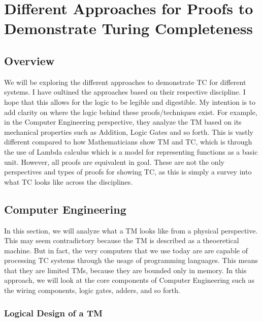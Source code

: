 \chapter{Different Approaches for Proofs to Demonstrate Turing Completeness}\label{chapter:ProofApproachesForTC}

\section{Overview}\label{sec:ProofOverview}

We will be exploring the different approaches to demonstrate TC for different systems.
I have oultined the approaches based on their respective discipline.
I hope that this allows for the logic to be legible and digestible.
My intention is to add clarity on where the logic behind these proofs/techniques exist.
For example, in the Computer Engineering perspective, they analyze the TM based on its mechanical properties such as Addition, Logic Gates and so forth.
This is vastly different compared to how Mathematicians show TM and TC, which is through the use of Lambda calculus which is a model for representing functions as a basic unit.
However, all proofs are equivalent in goal.
These are not the only perspectives and types of proofs for showing TC, as this is simply a survey into what TC looks like across the disciplines.

\section{Computer Engineering}\label{sec:CE}

In this section, we will analyze what a TM looks like from a physical perspective.
This may seem contradictory because the TM is described as a theoeretical machine.
But in fact, the very computers that we use today are are capable of processing TC systems through the usage of programming languages.
This means that they are limited TMs, because they are bounded only in memory.
In this approach, we will look at the core components of Computer Engineering such as the wiring components, logic gates, adders, and so forth.

\subsection{Logical Design of a TM}\label{subsec:TMLogicalDesign}

